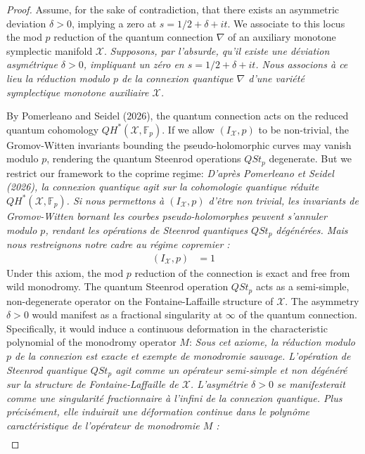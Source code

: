 \documentclass[11pt,a4paper]{article}
\theoremstyle{definition}
\begin{document}
\begin{proof}
Assume, for the sake of contradiction, that there exists an asymmetric deviation $\delta > 0$, implying a zero at $s = 1/2 + \delta + it$. We associate to this locus the mod $p$ reduction of the quantum connection $\nabla$ of an auxiliary monotone symplectic manifold $\mathcal{X}$.
\textit{Supposons, par l'absurde, qu'il existe une déviation asymétrique $\delta > 0$, impliquant un zéro en $s = 1/2 + \delta + it$. Nous associons à ce lieu la réduction modulo $p$ de la connexion quantique $\nabla$ d'une variété symplectique monotone auxiliaire $\mathcal{X}$.}

By Pomerleano and Seidel (2026), the quantum connection acts on the reduced quantum cohomology $QH^*(\mathcal{X}, \mathbb{F}_p)$. If we allow $(I_{\mathcal{X}}, p)$ to be non-trivial, the Gromov-Witten invariants bounding the pseudo-holomorphic curves may vanish modulo $p$, rendering the quantum Steenrod operations $QSt_p$ degenerate. But we restrict our framework to the coprime regime:
\textit{D'après Pomerleano et Seidel (2026), la connexion quantique agit sur la cohomologie quantique réduite $QH^*(\mathcal{X}, \mathbb{F}_p)$. Si nous permettons à $(I_{\mathcal{X}}, p)$ d'être non trivial, les invariants de Gromov-Witten bornant les courbes pseudo-holomorphes peuvent s'annuler modulo $p$, rendant les opérations de Steenrod quantiques $QSt_p$ dégénérées. Mais nous restreignons notre cadre au régime copremier :}
\begin{align*}
(I_{\mathcal{X}}, p) &= 1
\end{align*}
Under this axiom, the mod $p$ reduction of the connection is exact and free from wild monodromy. The quantum Steenrod operation $QSt_p$ acts as a semi-simple, non-degenerate operator on the Fontaine-Laffaille structure of $\mathcal{X}$. The asymmetry $\delta > 0$ would manifest as a fractional singularity at $\infty$ of the quantum connection. Specifically, it would induce a continuous deformation in the characteristic polynomial of the monodromy operator $M$:
\textit{Sous cet axiome, la réduction modulo $p$ de la connexion est exacte et exempte de monodromie sauvage. L'opération de Steenrod quantique $QSt_p$ agit comme un opérateur semi-simple et non dégénéré sur la structure de Fontaine-Laffaille de $\mathcal{X}$. L'asymétrie $\delta > 0$ se manifesterait comme une singularité fractionnaire à l'infini de la connexion quantique. Plus précisément, elle induirait une déformation continue dans le polynôme caractéristique de l'opérateur de monodromie $M$ :}
\begin{align*}

\end{align*}
\end{proof}
\end{document}
